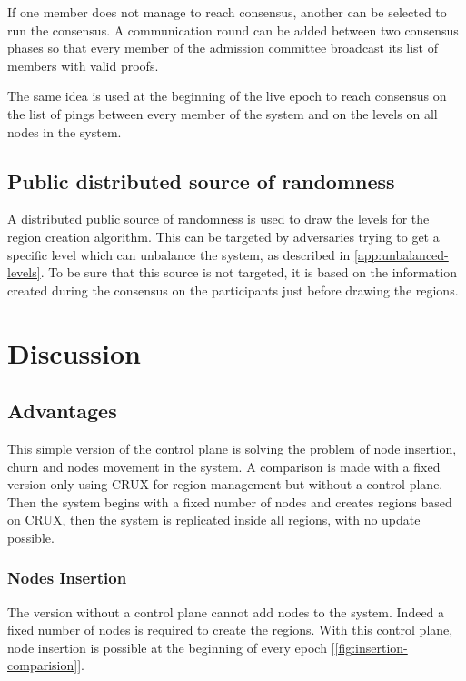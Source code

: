\documentclass[a4paper,11pt,oneside]{report}
\begin{document}
If one member does not manage to reach consensus, another can be selected to
run the consensus. A communication round can be added between two consensus
phases so that every member of the admission committee broadcast its list
of members with valid proofs.

The same idea is used at the beginning of the live epoch to reach consensus on
the list of pings between every member of the system and on the levels on all
nodes in the system.

\subsection{Public distributed source of randomness}
A distributed public
source of randomness is used to draw the levels for the region creation algorithm. This can be targeted by adversaries trying
to get a specific level which can unbalance the system, as described in
\autoref{app:unbalanced-levels}. To be sure that this source is not targeted,
it is based on the information created during the consensus on the participants
just before drawing the regions. 

\FloatBarrier
\section{Discussion}
\subsection{Advantages}
This simple version of the control plane is solving the problem of node
insertion, churn and nodes movement in the system. A comparison is made
with a fixed version only using CRUX for region management but without a
control plane. Then the system begins with a fixed number of nodes and creates
regions based on CRUX, then the system is replicated inside all regions, with
no update possible.

\subsubsection{Nodes Insertion}
The version without a control plane cannot add nodes to the system. Indeed a
fixed number of nodes is required to create the regions. With this control
plane, node insertion is possible at the beginning of every epoch
[\autoref{fig:insertion-comparision}].
\end{document}
